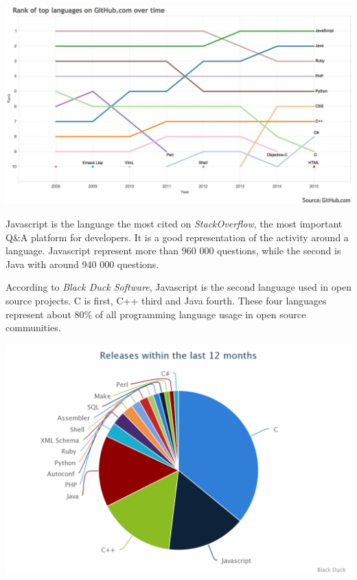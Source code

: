 \includegraphics[width=0.9\linewidth]{../../data/js-trends/github-ranks}


Javascript is the language the most cited on \textit{StackOverflow}, the most important Q\&A platform for developers.
It is a good representation of the activity around a language.
Javascript represent more than 960 000 questions, while the second is Java with around 940 000 questions.


According to \textit{Black Duck Software}, Javascript is the second language used in open source projects.
C is first, C++ third and Java fourth.
These four languages represent about 80\% of all programming language usage in open source communities.


\includegraphics[width=0.9\linewidth]{../../data/js-trends/black-duck-15}

